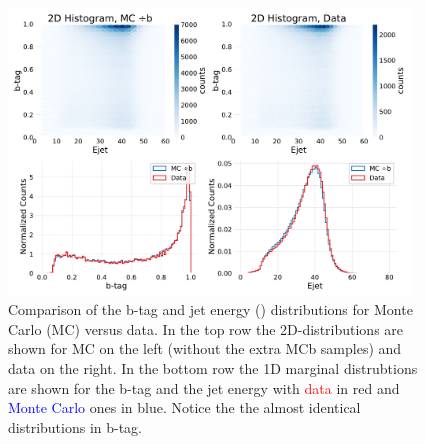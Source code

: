 \documentclass[a4paper, twoside, nobib]{tufte-book}
\newcommand{\code}[1]{\colorbox{light-gray}{\texttt{\detokenize{#1}}}}
\begin{document}
\begin{figure}
  \includegraphics[width=0.95\textwidth, trim=0 0 0 40, clip]{figures/quarks/2d-histograms-ejet-btag-comparison-down_sample=1.00-ML_vars=vertex-selection=b-ejet_min=4-n_iter_RS_lgb=99-n_iter_RS_xgb=9-cdot_cut=0.90-version=19-njet=3.pdf}
  \caption[Monte Carlo -- Data bias for b-tags and jet energy]
          {Comparison of the b-tag and jet energy (\code{Ejet}) distributions for Monte Carlo (MC) versus data. In the top row the 2D-distributions are shown for MC on the left (without the extra MCb samples) and data on the right. In the bottom row the 1D marginal distrubtions are shown for the b-tag and the jet energy with \textcolor{red}{data} in red and \textcolor{blue}{Monte Carlo} ones in blue. Notice the the almost identical distributions in b-tag. 
          } 
  \label{fig:q:btag_Ejet_comparison}
\end{figure}
\end{document}
